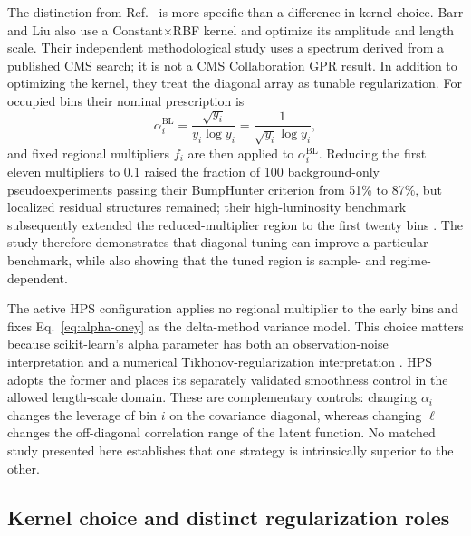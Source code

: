 The distinction from Ref.~\cite{BarrLiu2025} is more specific than a difference in
kernel choice. Barr and Liu also use a Constant$\times$RBF kernel and optimize its
amplitude and length scale. Their independent methodological study uses a spectrum
derived from a published CMS search; it is not a CMS Collaboration GPR result. In
addition to optimizing the kernel, they treat the diagonal array as tunable
regularization. For occupied bins their nominal prescription is
\begin{equation}
\alpha_i^{\mathrm{BL}}
= \frac{\sqrt{y_i}}{y_i\log y_i}
= \frac{1}{\sqrt{y_i}\log y_i},
\end{equation}
and fixed regional multipliers $f_i$ are then applied to
$\alpha_i^{\mathrm{BL}}$. Reducing the first eleven multipliers to 0.1 raised the
fraction of 100 background-only pseudoexperiments passing their BumpHunter criterion
from 51\% to 87\%, but localized residual structures remained; their high-luminosity
benchmark subsequently extended the reduced-multiplier region to the first twenty
bins \cite{BarrLiu2025}. The study therefore demonstrates that diagonal tuning can
improve a particular benchmark, while also showing that the tuned region is
sample- and regime-dependent.

The active HPS configuration applies no regional multiplier to the early bins and
fixes Eq.~\eqref{eq:alpha-oney} as the delta-method variance model. This choice matters
because scikit-learn's alpha parameter has both an observation-noise interpretation
and a numerical
Tikhonov-regularization interpretation \cite{ScikitLearnGPRDocs16}. HPS adopts the
former and places its separately validated smoothness control in the allowed
length-scale domain. These are complementary controls: changing $\alpha_i$ changes
the leverage of bin $i$ on the covariance diagonal, whereas changing $\ell$ changes
the off-diagonal correlation range of the latent function. No matched study presented
here establishes that one strategy is intrinsically superior to the other.

\subsection{Kernel choice and distinct regularization roles}
\label{sec:kernel-choice}

